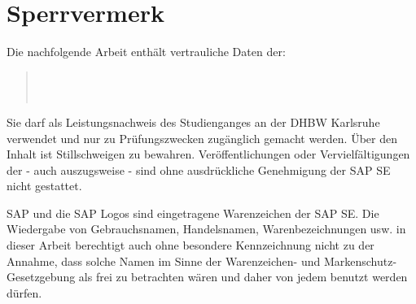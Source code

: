 \chapter*{Sperrvermerk}
Die nachfolgende Arbeit enthält vertrauliche Daten der:
\begin{quote}
	\firmaName \\
	\firmaStrasse \\
	\firmaPlz
\end{quote}

\vspace{0.5cm}

Sie darf als Leistungsnachweis des Studienganges \studiengang{} \studienjahr{} an der DHBW Karlsruhe verwendet und nur zu Prüfungszwecken zugänglich gemacht werden. Über den Inhalt ist Stillschweigen zu bewahren. Veröffentlichungen oder Vervielfältigungen der \arbeit{} - auch auszugsweise - sind ohne ausdrückliche Genehmigung der SAP SE nicht gestattet.

\vspace{0.5cm}

SAP und die SAP Logos sind eingetragene Warenzeichen der SAP SE.
Die Wiedergabe von Gebrauchsnamen, Handelsnamen, Warenbezeichnungen usw. in dieser Arbeit berechtigt auch ohne besondere Kennzeichnung nicht zu der Annahme, dass solche Namen im Sinne der Warenzeichen- und Markenschutz-Gesetzgebung als frei zu betrachten wären und daher von jedem benutzt werden dürfen.
